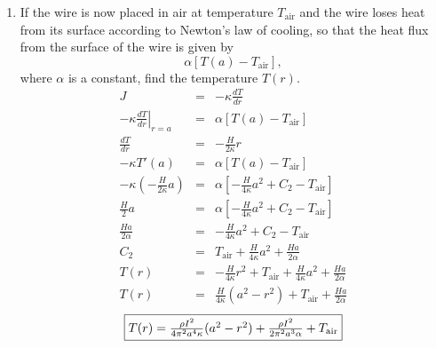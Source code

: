 \documentclass[12pt]{article}
\begin{document}
\begin{enumerate}
\begin{enumerate}
		\item If the wire is now placed in air at temperature $T_{\mathrm{air}}$ and the wire loses heat from its surface according to Newton’s law of cooling, so that the heat flux from the surface of the wire is given by $$\alpha [T(a) - T_{\mbox{air}}],$$
		where $\alpha$ is a constant, find the temperature $T(r)$.
		\begin{eqnarray*}
			J &=& -\kappa \frac{dT}{dr} \\
			-\kappa \left.\frac{dT}{dr}\right|_{r=a} &=& \alpha [T(a) - T_{\text{air}}] \\
	\frac{dT}{dr} &=& -\frac{H}{2\kappa} r \\
			-\kappa T'(a) &=& \alpha [T(a) - T_{\text{air}}] \\
			-\kappa \left(-\frac{H}{2\kappa} a \right) &=& \alpha \left[-\frac{H}{4\kappa} a^2 + C_2 - T_{\text{air}} \right] \\
			\frac{H}{2} a &=& \alpha \left[-\frac{H}{4\kappa} a^2 + C_2 - T_{\text{air}} \right] \\
			\frac{H a}{2\alpha} &=& -\frac{H}{4\kappa} a^2 + C_2 - T_{\text{air}} \\
			C_2 &=& T_{\text{air}} + \frac{H}{4\kappa} a^2 + \frac{H a}{2\alpha} \\
			T(r) &=& -\frac{H}{4\kappa} r^2 + T_{\text{air}} + \frac{H}{4\kappa} a^2 + \frac{H a}{2\alpha} \\
			T(r) &=& \frac{H}{4\kappa} (a^2 - r^2) + T_{\text{air}} + \frac{H a}{2\alpha}
	\end{eqnarray*}
		$$\fbox{$T(r) = \frac{\rho I^2}{4\pi^2 a^4 \kappa} (a^2 - r^2) + \frac{\rho I^2}{2\pi^2 a^3 \alpha} + T_{\text{air}}$}$$
	\end{enumerate}
\end{enumerate}
\end{document}
